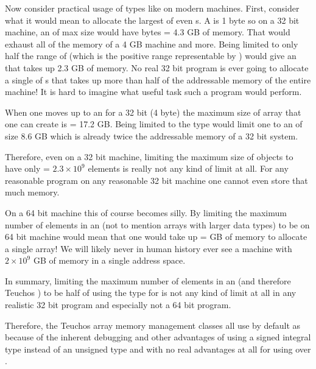 \documentclass[pdf,ps2pdf,11pt]{SANDreport}
\begin{document}
Now consider practical usage of types like {} on
modern machines.  First, consider what it would mean to allocate the
largest {} of even {}s.  A {} is
1 byte so on a 32 bit machine, an {} of max
size would have {} bytes = 4.3 GB of memory.  That
would exhaust all of the memory of a 4 GB machine and more.  Being
limited to only half the range of {} (which is the
positive range representable by {}) would give an
{} that takes up 2.3 GB of memory.  No real 32
bit program is ever going to allocate a single {} of
{}s that takes up more than half of the addressable memory
of the entire machine!  It is hard to imagine what useful task such a
program would perform.

When one moves up to an {} for a 32 bit (4 byte)
{} the maximum size of array that one can create is
{} = 17.2 GB.  Being limited to the
{} type {} would limit one to an
{} of size 8.6 GB which is already twice the
addressable memory of a 32 bit system.

Therefore, even on a 32 bit machine, limiting the maximum size of
{} objects to have only
{} = $2.3\times{}10^9$
elements is really not any kind of limit at all.  For any reasonable
program on any reasonable 32 bit machine one cannot even store that
much memory.

On a 64 bit machine this of course becomes silly.  By limiting the
maximum number of elements in an {} (not to
mention arrays with larger data types) to be
{} on 64 bit machine
would mean that one would take up {} =
{} GB of memory to allocate a single array!  We will
likely never in human history ever see a machine with $2\times{}10^9$
GB of memory in a single address space.

In summary, limiting the maximum number of elements in an
{} (and therefore Teuchos {}) to be half
of {} using the {} type
{} for {} is not any kind of limit at
all in any realistic 32 bit program and especially not a 64 bit
program.

Therefore, the Teuchos array memory management classes all use by
default {} as {} because of the
inherent debugging and other advantages of using a signed integral
type instead of an unsigned type and with no real advantages at all
for using {} over {}.
\end{document}
